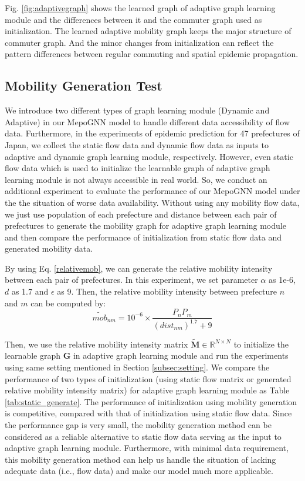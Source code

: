 \documentclass[lettersize,journal]{IEEEtran}
\begin{document}
Fig. \ref{fig:adaptivegraph} shows the learned graph of adaptive graph learning module and the differences between it and the commuter graph used as initialization. The learned adaptive mobility graph keeps the major structure of commuter graph. And the minor changes from initialization can reflect the pattern differences between regular commuting and spatial epidemic propagation.

\subsection{Mobility Generation Test}
We introduce two different types of graph learning module (Dynamic and Adaptive) in our MepoGNN model to handle different data accessibility of flow data. Furthermore, in the experiments of epidemic prediction for 47 prefectures of Japan, we collect the static flow data and dynamic flow data as inputs to adaptive and dynamic graph learning module, respectively. However, even static flow data which is used to initialize the learnable graph of adaptive graph learning module is not always accessible in real world. So, we conduct an additional experiment to evaluate the performance of our MepoGNN model under the the situation of worse data availability. Without using any mobility flow data, we just use population of each prefecture and distance between each pair of prefectures to generate the mobility graph for adaptive graph learning module and then compare the performance of initialization from static flow data and generated mobility data. 

By using Eq. \ref{relativemob}, we can generate the relative mobility intensity between each pair of prefectures. In this experiment, we set parameter $\alpha$ as 1e-6, $d$ as 1.7 and $\epsilon$ as 9. Then, the relative mobility intensity between prefecture $n$ and $m$ can be computed by: 
\begin{equation}
    \widetilde{mob}_{nm} = 10^{-6} \times \frac{P_n P_m}{(dist_{nm})^{1.7} + 9}
\end{equation}

Then, we use the relative mobility intensity matrix $\mathbf{\widetilde M} \in \mathbb{R}^{N \times N}$ to initialize the learnable graph $\mathbf{G}$ in adaptive graph learning module and run the experiments using same setting mentioned in Section \ref{subsec:setting}. We compare the performance of two types of initialization (using static flow matrix or generated relative mobility intensity matrix) for adaptive graph learning module as Table \ref{tab:static_generate}. The performance of initialization using mobility generation is competitive, compared with that of initialization using static flow data. Since the performance gap is very small, the mobility generation method can be considered as a reliable alternative to static flow data serving as the input to adaptive graph learning module. Furthermore, with minimal data requirement, this mobility generation method can help us handle the situation of lacking adequate data (i.e., flow data) and make our model much more applicable. 
\end{document}
